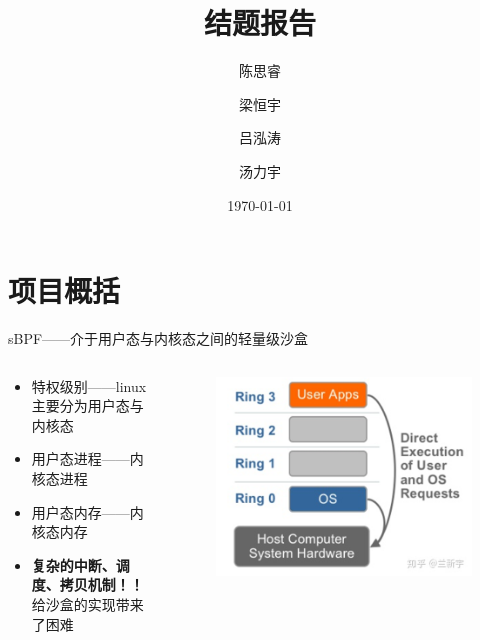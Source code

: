 \documentclass[UTF8,fontset=macnew,xcolor=table]{ctexbeamer}
\begin{document}
\title[结题报告——sBPF]{\huge 结题报告}
\author[中国科学技术大学]{陈思睿 \and 梁恒宇 \and 吕泓涛 \and 汤力宇}
\date[\today]{\today}
\begin{frame}
    \titlepage
\end{frame}

\section{项目概括}
\begin{frame}{sBPF——介于用户态与内核态之间的轻量级沙盒}
    \begin{columns}
        \begin{column}{0.75\textwidth}
            \begin{itemize}
                \item 特权级别——linux主要分为用户态与内核态
                \item 用户态进程——内核态进程
                \item 用户态内存——内核态内存
                
                \item \textbf{\Large 复杂的中断、调度、拷贝机制！！}\\
                给沙盒的实现带来了困难
                
            \end{itemize}
        \end{column}

        \begin{column}{0.25\textwidth}
            \begin{figure}[H]
                \centering
                \includegraphics[width=\columnwidth]{pic1.png}
            \end{figure}
        \end{column}
    \end{columns}
\end{frame}
\end{document}
